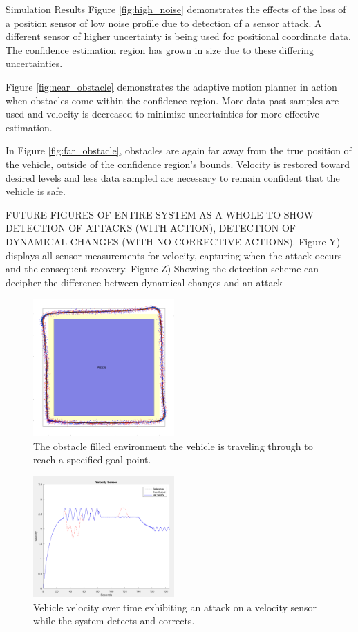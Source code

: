 \begin{section}{Simulation Results}
Figure \ref{fig:high_noise} demonstrates the effects of the loss of a position sensor of low noise profile due to detection of a sensor attack. A different sensor of higher uncertainty is being used for positional coordinate data. The confidence estimation region has grown in size due to these differing uncertainties.

Figure \ref{fig:near_obstacle} demonstrates the adaptive motion planner in action when obstacles come within the confidence region. More data past samples are used and velocity is decreased to minimize uncertainties for more effective estimation.

In Figure \ref{fig:far_obstacle}, obstacles are again far away from the true position of the vehicle, outside of the confidence region's bounds. Velocity is restored toward desired levels and less data sampled are necessary to remain confident that the vehicle is safe.


FUTURE FIGURES OF ENTIRE SYSTEM AS A WHOLE TO SHOW DETECTION OF ATTACKS (WITH ACTION), DETECTION OF DYNAMICAL CHANGES (WITH NO CORRECTIVE ACTIONS).
Figure Y) displays all sensor measurements for velocity, capturing when the attack occurs and the consequent recovery. 
Figure Z) Showing the detection scheme can decipher the difference between dynamical changes and an attack


\begin{figure}
\vspace{1pt}
\centering
\includegraphics[width=0.48\textwidth]{sim_environment.png}
\caption{The obstacle filled environment the vehicle is traveling through to reach a specified goal point.}
\label{fig:sim_env}
\end{figure}

\begin{figure}
\vspace{1pt}
\centering
\includegraphics[width=0.48\textwidth]{vel_t.png}
\caption{Vehicle velocity over time exhibiting an attack on a velocity sensor while the system detects and corrects.}
\label{fig:vel_t}
\end{figure}


\end{section}
